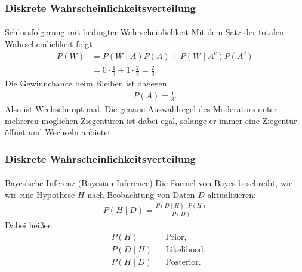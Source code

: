 \documentclass{beamer}
\begin{document}
\begin{frame}
    \frametitle{Diskrete Wahrscheinlichkeitsverteilung}
\framesubtitle{}

\begin{block}{Schlussfolgerung mit bedingter Wahrscheinlichkeit}
Mit dem Satz der totalen Wahrscheinlichkeit folgt
\begin{align*}
P(W)
&= P(W \mid A)P(A) + P(W \mid A^c)P(A^c) \\
&= 0 \cdot \frac13 + 1 \cdot \frac23
= \frac23.
\end{align*}
Die Gewinnchance beim Bleiben ist dagegen
\begin{align*}
P(A)=\frac13.
\end{align*}
Also ist Wechseln optimal. Die genaue Auswahlregel des Moderators unter mehreren möglichen Ziegentüren ist dabei egal, solange er immer eine Ziegentür öffnet und Wechseln anbietet.
\end{block}

 \end{frame}


\begin{frame}
    \frametitle{Diskrete Wahrscheinlichkeitsverteilung}
\framesubtitle{}

\begin{block}{Bayes'sche Inferenz (Bayesian Inference)}
Die Formel von Bayes beschreibt, wie wir eine Hypothese $H$ nach Beobachtung von Daten $D$ aktualisieren:
\begin{align*}
P(H \mid D) = \frac{P(D \mid H) \cdot P(H)}{P(D)}
\end{align*}
Dabei heißen
\begin{align*}
&P(H) &&\text{Prior}, \\
&P(D \mid H) &&\text{Likelihood}, \\
&P(H \mid D) &&\text{Posterior}.
\end{align*}
\end{block}

 \end{frame}
\end{document}
